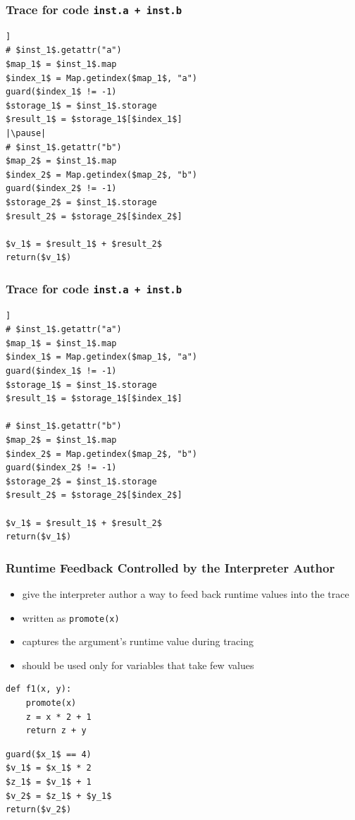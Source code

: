 \documentclass[utf8x]{beamer}
\newcommand{\noop}{}
\begin{document}
\begin{frame}
\frametitle{Trace for code \texttt{inst.a + inst.b}}
\begin{lstlisting}[mathescape,escapechar=|,basicstyle=\ttfamily]]
# $inst_1$.getattr("a")
$map_1$ = $inst_1$.map
$index_1$ = Map.getindex($map_1$, "a")
guard($index_1$ != -1)
$storage_1$ = $inst_1$.storage
$result_1$ = $storage_1$[$index_1$]
|\pause|
# $inst_1$.getattr("b")
$map_2$ = $inst_1$.map
$index_2$ = Map.getindex($map_2$, "b")
guard($index_2$ != -1)
$storage_2$ = $inst_1$.storage
$result_2$ = $storage_2$[$index_2$]

$v_1$ = $result_1$ + $result_2$
return($v_1$)
\end{lstlisting}
\end{frame}

\begin{frame}
\frametitle{Trace for code \texttt{inst.a + inst.b}}
\begin{lstlisting}[mathescape,escapechar=|,basicstyle=\ttfamily]]
# $inst_1$.getattr("a")
$map_1$ = $inst_1$.map
$index_1$ = Map.getindex($map_1$, "a")
guard($index_1$ != -1)
$storage_1$ = $inst_1$.storage
$result_1$ = $storage_1$[$index_1$]

# $inst_1$.getattr("b")
$map_2$ = $inst_1$.map
$index_2$ = Map.getindex($map_2$, "b")
guard($index_2$ != -1)
$storage_2$ = $inst_1$.storage
$result_2$ = $storage_2$[$index_2$]

$v_1$ = $result_1$ + $result_2$
return($v_1$)
\end{lstlisting}
\end{frame}

\begin{frame}[containsverbatim]
  \frametitle{Runtime Feedback Controlled by the Interpreter Author}
  \begin{itemize}
      \item give the interpreter author a way to feed back runtime values into the trace
      \item written as \texttt{promote(x)}
      \item captures the argument's runtime value during tracing
      \item should be used only for variables that take few values
  \end{itemize}
  \pause

  \begin{minipage}[b]{6cm}
      \centering
      {\noop
      \begin{lstlisting}[mathescape,basicstyle=\ttfamily]
def f1(x, y):
    promote(x)
    z = x * 2 + 1
    return z + y
      \end{lstlisting}
      }
  \end{minipage}
  \vline
  \hspace{0.5cm}
  \begin{minipage}[b]{4cm}
      {\noop
      \begin{lstlisting}[mathescape,basicstyle=\ttfamily]
guard($x_1$ == 4)
$v_1$ = $x_1$ * 2
$z_1$ = $v_1$ + 1
$v_2$ = $z_1$ + $y_1$
return($v_2$)
      \end{lstlisting}
      }
  \end{minipage}
\end{frame}
\end{document}
